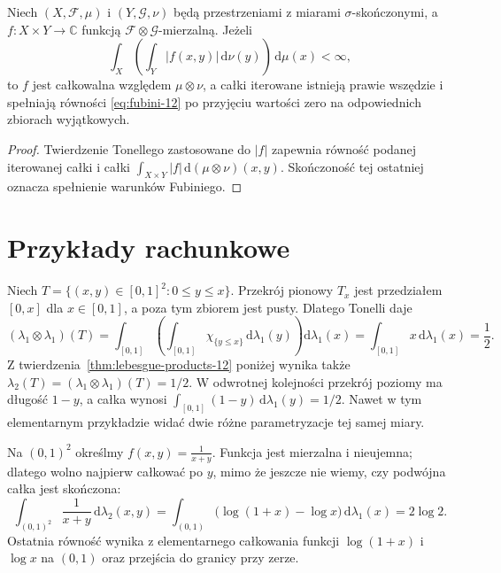 \begin{wniosek}
\label{cor:practical-fubini-12}
Niech $(X,\mathcal F,\mu)$ i $(Y,\mathcal G,\nu)$
będą przestrzeniami z miarami $\sigma$-skończonymi,
a $f:X\times Y\to\mathbb C$ funkcją
$\mathcal F\otimes\mathcal G$-mierzalną.
Jeżeli
\[
\int_X\left(\int_Y |f(x,y)|\,\mathrm d\nu(y)\right)
\,\mathrm d\mu(x)<\infty,
\]
to $f$ jest całkowalna
względem $\mu\otimes\nu$, a całki iterowane
istnieją prawie wszędzie i spełniają
równości \eqref{eq:fubini-12} po przyjęciu
wartości zero na odpowiednich zbiorach wyjątkowych.
\end{wniosek}
\begin{proof}
Twierdzenie Tonellego zastosowane do $|f|$ zapewnia
równość podanej iterowanej całki i całki
$\int_{X\times Y}|f|\,\mathrm d(\mu\otimes\nu)(x,y)$.
Skończoność tej ostatniej oznacza spełnienie
warunków Fubiniego.
\end{proof}

\section{Przykłady rachunkowe}

\begin{przyklad}
Niech $T=\{(x,y)\in[0,1]^2:0\le y\le x\}$.
Przekrój pionowy $T_x$ jest przedziałem $[0,x]$
dla $x\in[0,1]$, a poza tym zbiorem jest pusty.
Dlatego Tonelli daje
\[
(\lambda_1\otimes\lambda_1)(T)=\int_{[0,1]}\left(
\int_{[0,1]}\chi_{\{y\le x\}}\,\mathrm d\lambda_1(y)
\right)\mathrm d\lambda_1(x)
=\int_{[0,1]}x\,\mathrm d\lambda_1(x)=\frac12.
\]
Z twierdzenia~\ref{thm:lebesgue-products-12} poniżej wynika także
$\lambda_2(T)=(\lambda_1\otimes\lambda_1)(T)=1/2$.
W odwrotnej kolejności przekrój poziomy ma długość
$1-y$, a całka wynosi
$\int_{[0,1]}(1-y)\,\mathrm d\lambda_1(y)=1/2$.
Nawet w tym elementarnym przykładzie widać dwie
różne parametryzacje tej samej miary.
\end{przyklad}

\begin{przyklad}
Na $(0,1)^2$ określmy $f(x,y)=\frac{1}{x+y}$.
Funkcja jest mierzalna i nieujemna; dlatego wolno
najpierw całkować po $y$, mimo że jeszcze nie
wiemy, czy podwójna całka jest skończona:
\[
\int_{(0,1)^2}\frac{1}{x+y}\,\mathrm d\lambda_2(x,y)
=\int_{(0,1)}\bigl(\log(1+x)-\log x\bigr)
\,\mathrm d\lambda_1(x)=2\log2.
\]
Ostatnia równość wynika z elementarnego
całkowania funkcji $\log(1+x)$ i $\log x$
na $(0,1)$ oraz przejścia do granicy przy zerze.
\end{przyklad}

